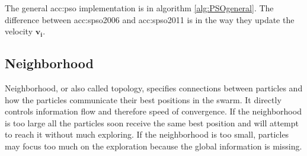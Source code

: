 The general \acrshort{acc:pso} implementation is in algorithm \ref{alg:PSOgeneral}. The difference between \acrshort{acc:spso2006} and \acrshort{acc:spso2011} is in the way they update the velocity $\mathbf{v_i}$.

\subsection{Neighborhood}
\label{chap:psoneig}

Neighborhood, or also called topology, specifies connections between particles and how the particles communicate their best positions in the swarm. It directly controls information flow and therefore speed of convergence. If the neighborhood is too large all the particles soon receive the same best position and will attempt to reach it without much exploring. If the neighborhood is too small, particles may focus too much on the exploration because the global information is missing.

